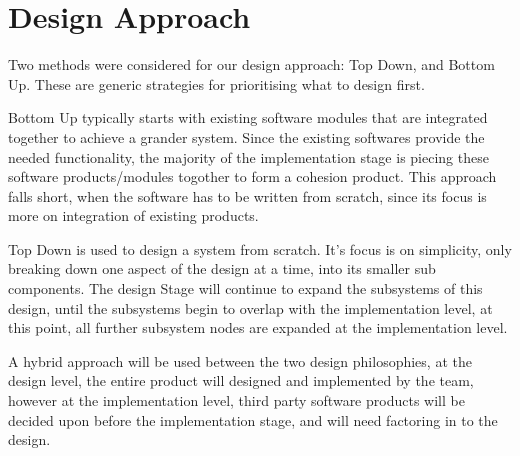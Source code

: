 \section{Design Approach}



Two methods were considered for our design approach: Top Down, and Bottom Up.
These are generic strategies for prioritising what to design first.

Bottom Up typically starts with existing software modules that are integrated together to achieve a grander system.
Since the existing softwares provide the needed functionality, the majority of the implementation stage is piecing these software products/modules togother to form a cohesion product.
This approach falls short, when the software has to be written from scratch, since its focus is more on integration of existing products.

Top Down is used to design a system from scratch.
It's focus is on simplicity, only breaking down one aspect of the design at a time, into its smaller sub components.
The design Stage will continue to expand the subsystems of this design, until the subsystems begin to overlap with the implementation level, at this point, all further subsystem nodes are expanded at the implementation level.

A hybrid approach will be used between the two design philosophies, at the design level, the  entire product will designed and implemented by the team, however at the implementation level, third party software products will be decided upon before the implementation stage, and will need factoring in to the design.

